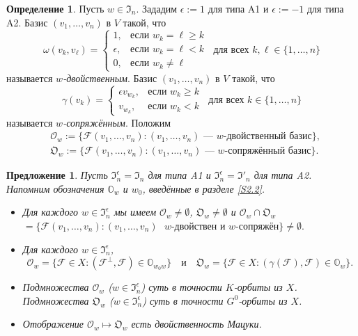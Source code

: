 \documentclass{amsart}
\newtheorem{proposition}{Предложение}
\theoremstyle{definition}
\newtheorem{definition}{Определение}
\begin{document}
\begin{definition}
\label{DA12}
Пусть $w\in\mathfrak{I}_n$. Зададим $\epsilon:=1$ для типа A1 и
$\epsilon:=-1$ для типа A2. Базис $(v_1,\ldots,v_n)$ в $V$ такой, что
\[\omega(v_k,v_\ell)=\left\{\begin{array}{ll} 1, & \mbox{если $w_k=\ell\geq k$} \\ \epsilon, & \mbox{если $w_k=\ell< k$} \\ 0, & \mbox{если $w_k\not=\ell$} \end{array}\right.
\ \mbox{ для всех $k,\ell\in\{1,\ldots,n\}$}\] называется {\em
$w$-двойственным}. Базис $(v_1,\ldots,v_n)$ в $V$ такой, что 
\[
\gamma(v_k)=\left\{\begin{array}{ll} \epsilon v_{w_k}, & \mbox{если $w_k\geq k$}
\\ v_{w_k}, & \mbox{если $w_k< k$}
\end{array}\right.
\ \mbox{ для всех $k\in\{1,\ldots,n\}$}
\]
называется {\em $w$-сопряжённым}. Положим
\begin{eqnarray*}
 & \mathcal{O}_w:=\{\mathcal{F}(v_1,\ldots,v_n):\mbox{$(v_1,\ldots,v_n)$ ---  $w$-двойственный базис}\}, \\[1mm]
 & \mathfrak{O}_w:=\{\mathcal{F}(v_1,\ldots,v_n):\mbox{$(v_1,\ldots,v_n)$ --- $w$-сопряжённый базис}\}.
\end{eqnarray*}
\end{definition}



\begin{proposition}
\label{P1} Пусть $\mathfrak{I}_n^\epsilon=\mathfrak{I}_n$ для типа A1
и $\mathfrak{I}_n^\epsilon=\mathfrak{I}'_n$ для типа A2. Напомним обозначения
$\mathbb{O}_w$ и $w_0$, введённые  в разделе \ref{S2.2}.
\begin{itemize}
\item[\rm (a)]
Для каждого $w\in\mathfrak{I}_n^\epsilon$ мы имеем
$\mathcal{O}_w\not =\emptyset$, $\mathfrak{O}_w\not=\emptyset$
и
$\mathcal{O}_w\cap\mathfrak{O}_w $ $=\{\mathcal{F}(v_1,\ldots,v_n):\mbox{$(v_1,\ldots,v_n)$  $w$-двойствен и $w$-сопряжён}\}\not=\emptyset.$
\item[\rm (b)]
Для каждого $w\in \mathfrak{I}_n^\epsilon$,
\[
\mathcal{O}_w=\{\mathcal{F}\in
X:(\mathcal{F}^\perp,\mathcal{F})\in\mathbb{O}_{w_0w}\}
\quad\mbox{и}\quad \mathfrak{O}_w=\{\mathcal{F}\in
X:(\gamma(\mathcal{F}),\mathcal{F})\in\mathbb{O}_{w}\}.
\]
\item[\rm (c)]
Подмножества $\mathcal{O}_w$ ($w\in\mathfrak{I}_n^\epsilon$) суть в точности $K$-орбиты из $X$. Подмножества $\mathfrak{O}_w$
($w\in\mathfrak{I}_n^\epsilon$) суть в точности $G^0$-орбиты из $X$.
\item[\rm (d)]
Отображение $\mathcal{O}_w\mapsto\mathfrak{O}_w$ есть двойственность Мацуки.
\end{itemize}
\end{proposition}
\end{document}
